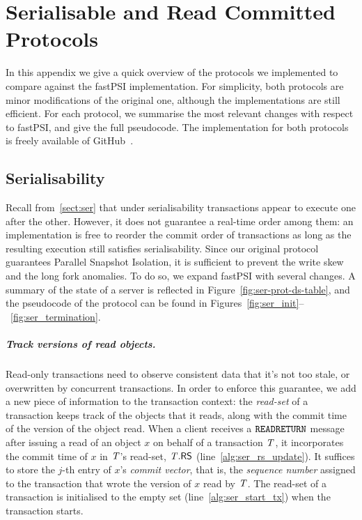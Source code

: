 \cleardoublepage
\chapter{Serialisable and Read Committed Protocols}
\label{appendix:code}

In this appendix we give a quick overview of the protocols we implemented to compare against the fastPSI implementation. For simplicity, both protocols are minor modifications of the original one, although the implementations are still efficient. For each protocol, we summarise the most relevant changes with respect to fastPSI, and give the full pseudocode. The implementation for both protocols is freely available of GitHub~\citep{pvc-client, pvc-server}.

\section{Serialisability}
\label{appendix:ser}

Recall from~\ref{sect:ser} that under serialisability transactions appear to execute one after the other. However, it does not guarantee a real-time order among them: an implementation is free to reorder the commit order of transactions as long as the resulting execution still satisfies serialisability. Since our original protocol guarantees Parallel Snapshot Isolation, it is sufficient to prevent the write skew and the long fork anomalies. To do so, we expand fastPSI with several changes. A summary of the state of a server is reflected in Figure~\ref{fig:ser-prot-ds-table}, and the pseudocode of the protocol can be found in Figures~\ref{fig:ser_init}--~\ref{fig:ser_termination}.

\paragraph{Track versions of read objects.} Read-only transactions need to observe consistent data that it's not too stale, or overwritten by concurrent transactions. In order to enforce this guarantee, we add a new piece of information to the transaction context: the \emph{read-set} of a transaction keeps track of the objects that it reads, along with the commit time of the version of the object read. When a client receives a ${\tt READRETURN}$ message after issuing a read of an object $x$ on behalf of a transaction $\mathit{T}$, it incorporates the commit time of $x$ in $\mathit{T}$'s read-set, $\mathit{T}.\mathsf{RS}$ (line~\ref{alg:ser_rs_update}). It suffices to store the $j$-th entry of $x$'s \emph{commit vector}, that is, the \emph{sequence number} assigned to the transaction that wrote the version of $x$ read by $\mathit{T}$. The read-set of a transaction is initialised to the empty set (line~\ref{alg:ser_start_tx}) when the transaction starts.

